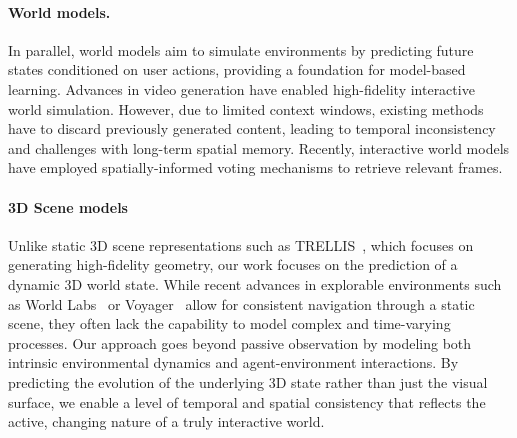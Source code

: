 \documentclass{article}
\theoremstyle{plain}
\theoremstyle{definition}
\theoremstyle{remark}
\begin{document}
\paragraph{World models.} In parallel, world models aim to simulate environments by predicting future states conditioned on user actions, providing a foundation for model-based learning.
Advances in video generation have enabled high-fidelity interactive world simulation.
However, due to limited context windows, existing methods have to discard previously generated content, leading to temporal inconsistency and challenges with long-term spatial memory.
Recently, interactive world models have employed spatially-informed voting mechanisms to retrieve relevant frames.

\paragraph{3D Scene models}


Unlike static 3D scene representations such as TRELLIS~\citep{xiang2024structured}, which focuses on generating high-fidelity geometry, our work focuses on the prediction of a dynamic 3D world state.
While recent advances in explorable environments such as World Labs~\citep{worldlab} or Voyager~\citep{huang2025voyager} allow for consistent navigation through a static scene, they often lack the capability to model complex and time-varying processes.
Our approach goes beyond passive observation by modeling both intrinsic environmental dynamics and agent-environment interactions.
By predicting the evolution of the underlying 3D state rather than just the visual surface, we enable a level of temporal and spatial consistency that reflects the active, changing nature of a truly interactive world.
\end{document}
